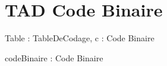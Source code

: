 \documentclass{article}
\begin{document}
\section{TAD Code Binaire}
\begin{algorithme}
	{Table : TableDeCodage, c : \caractere}{Code Binaire}
	{}
\end{algorithme}
\begin{algorithme}
	{codeBinaire : Code Binaire}{\booleen}
	{}
\end{algorithme}
\end{document}
